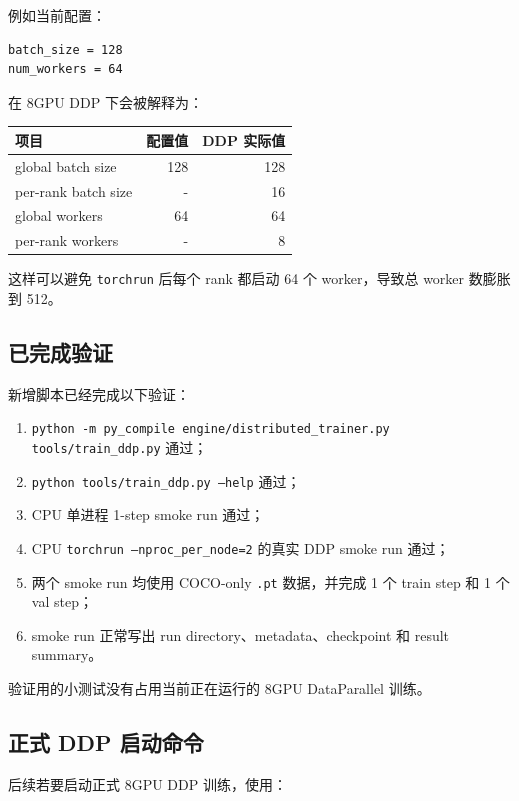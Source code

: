 \documentclass[UTF8]{ctexart}
\begin{document}
例如当前配置：

\begin{verbatim}
batch_size = 128
num_workers = 64
\end{verbatim}

在 8GPU DDP 下会被解释为：

\begin{center}
\begin{tabular}{lrr}
\toprule
项目 & 配置值 & DDP 实际值 \\
\midrule
global batch size & 128 & 128 \\
per-rank batch size & - & 16 \\
global workers & 64 & 64 \\
per-rank workers & - & 8 \\
\bottomrule
\end{tabular}
\end{center}

这样可以避免 \texttt{torchrun} 后每个 rank 都启动 64 个 worker，导致总 worker 数膨胀到 512。

\subsection{已完成验证}

新增脚本已经完成以下验证：

\begin{enumerate}[leftmargin=2em]
  \item \texttt{python -m py\_compile engine/distributed\_trainer.py tools/train\_ddp.py} 通过；
  \item \texttt{python tools/train\_ddp.py --help} 通过；
  \item CPU 单进程 1-step smoke run 通过；
  \item CPU \texttt{torchrun --nproc\_per\_node=2} 的真实 DDP smoke run 通过；
  \item 两个 smoke run 均使用 COCO-only \texttt{.pt} 数据，并完成 1 个 train step 和 1 个 val step；
  \item smoke run 正常写出 run directory、metadata、checkpoint 和 result summary。
\end{enumerate}

验证用的小测试没有占用当前正在运行的 8GPU DataParallel 训练。

\subsection{正式 DDP 启动命令}

后续若要启动正式 8GPU DDP 训练，使用：
\end{document}
